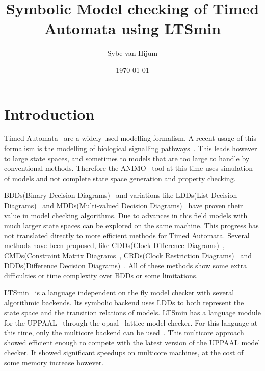 \documentclass[11pt]{article}
\begin{document}
\newtheorem{mydef}{Definition}
\title{Symbolic Model checking of Timed Automata using LTSmin}
\author{Sybe van Hijum}
\date{\today}
\maketitle

\tableofcontents

\section{Introduction}
Timed Automata~\cite{Alur1994183} are a widely used modelling formalism. A recent usage of this formalism is the modelling of biological signalling pathways~\cite{DBLP:conf/bibe/SchivoSWCVKLPP12}. This leads however to large state spaces, and sometimes to models that are too large to handle by conventional methods. Therefore the ANIMO~\cite{DBLP:conf/bibe/SchivoSWCVKLPP12} tool at this time uses simulation of models and not complete state space generation and property checking.

BDDs(Binary Decision Diagrams)~\cite{?} and variations like LDDs(List Decision Diagrams)~\cite{so62465} and MDDs(Multi-valued Decision Diagrams)~\cite{129849} have proven their value in model checking algorithms. Due to advances in this field models with much larger state spaces can be explored on the same machine. This progress has not translated directly to more efficient methods for Timed Automata. Several methods have been proposed, like CDDs(Clock Difference Diagrams)~\cite{BRICS19491}, CMDs(Constraint Matrix Diagrams~\cite{5702245}, CRDs(Clock Restriction Diagrams)~\cite{crds} and DDDs(Difference Decision Diagrams)~\cite{ddds}. All of these methods show some extra difficulties or time complexity over BDDs or some limitations.

LTSmin~\cite{eemcs18152,ltsmin-mc:nmf2011} is a language independent on the fly model checker with several algorithmic backends. Its symbolic backend uses LDDs to both represent the state space and the transition relations of models. LTSmin has a language module for the UPPAAL~\cite{UPPAAL} through the opaal~\cite{opaal} lattice model checker. For this language at this time, only the multicore backend can be used~\cite{eemcs21972}. This multicore approach showed efficient enough to compete with the latest version of the UPPAAL model checker. It showed significant speedups on multicore machines, at the cost of some memory increase however.
\end{document}
